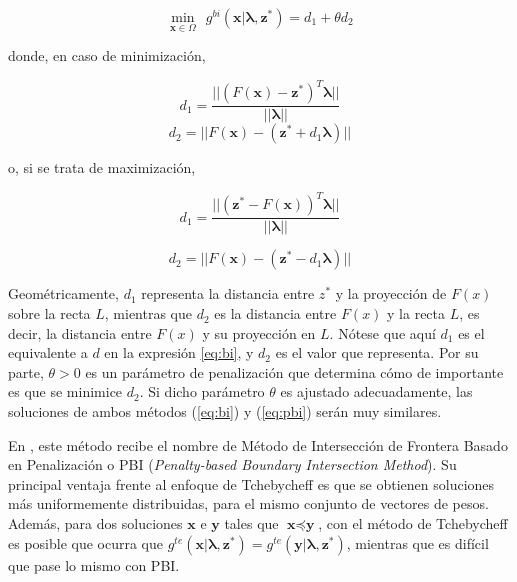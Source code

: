\begin{enumerate}
	\begin{equation}\label{eq:pbi}
		\min_{\textbf{x} \in \Omega}{~~g^{bi}(\textbf{x} | \boldsymbol\lambda, \textbf{z}^*) = d_1 + \theta d_2}
	\end{equation}

	donde, en caso de minimización,
	
	\begin{equation}
	d_1 = \frac{|| (F(\textbf{x}) - \textbf{z}^*)^T \boldsymbol\lambda ||}{||\boldsymbol\lambda||}
	\end{equation}
	\begin{equation}
	d_2 = || F(\textbf{x}) - (\textbf{z}^* + d_1 \boldsymbol\lambda) ||
	\end{equation}
	
	o, si se trata de maximización,

	\begin{equation}
	d_1 = \frac{|| (\textbf{z}^* - F(\textbf{x}))^T \boldsymbol\lambda ||}{||\boldsymbol\lambda||}
	\end{equation}
	
	\begin{equation}d_2 = || F(\textbf{x}) - (\textbf{z}^* - d_1 \boldsymbol\lambda) ||
	\end{equation}
	
	Geométricamente, $d_1$ representa la distancia entre $z^*$ y la proyección de $F(x)$ sobre la recta $L$, mientras que $d_2$ es la distancia entre $F(x)$ y la recta $L$, es decir, la distancia entre  $F(x)$ y su proyección en $L$. Nótese que aquí $d_1$ es el equivalente a $d$ en la expresión \ref{eq:bi}, y $d_2$ es el valor que representa. Por su parte, $\theta > 0$ es un parámetro de penalización que determina cómo de importante es que se minimice $d_2$. Si dicho parámetro $\theta$ es ajustado adecuadamente, las soluciones de ambos métodos (\ref{eq:bi}) y (\ref{eq:pbi}) serán muy similares.
	
	En \cite{zhang2007moea}, este método recibe el nombre de Método de Intersección de Frontera Basado en Penalización o PBI (\emph{Penalty-based Boundary Intersection Method}). Su principal ventaja frente al enfoque de Tchebycheff es que se obtienen soluciones más uniformemente distribuidas, para el mismo conjunto de vectores de pesos. Además, para dos soluciones $\textbf{x}$ e $\textbf{y}$ tales que $\textbf{x} \preceq \textbf{y}$, con el método de Tchebycheff es posible que ocurra que $g^{te}(\textbf{x} | \boldsymbol\lambda, \textbf{z}^*) = g^{te}(\textbf{y} | \boldsymbol\lambda, \textbf{z}^*)$, mientras que es difícil que pase lo mismo con PBI.
	

\end{enumerate}

